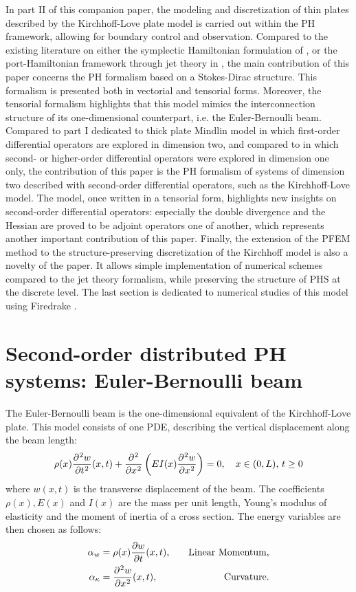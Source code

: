 \documentclass[preprint,12pt]{elsarticle}
\newcommand{\firstReviewer}[1]{\textcolor{red!80!black}{#1}}
\newcommand{\secondReviewer}[1]{\textcolor{blue!80!black}{#1}}
\begin{document}
In part II of this companion paper, the modeling and discretization of thin plates described by the Kirchhoff-Love plate model is carried out within the PH framework, allowing for boundary control and observation. Compared to the existing literature on either the symplectic Hamiltonian formulation of  \cite{LI2016984,LI2018310}, or the port-Hamiltonian framework through jet theory in \secondReviewer{\cite{jetMin,jetKirchh}}, the main contribution of this paper concerns the PH formalism based on a Stokes-Dirac structure. This formalism is presented both in vectorial and tensorial forms.  Moreover, the tensorial formalism \cite[Chapter~16]{Grinfield} highlights that this model mimics the interconnection structure of its one-dimensional counterpart, i.e. the Euler-Bernoulli beam. Compared to part I dedicated to thick plate Mindlin model in which first-order differential operators are explored in dimension two, and compared to \cite{LeGorrec2005} in which second-  or higher-order differential operators were explored in dimension one only, the contribution of this paper is the PH formalism of systems of dimension two described with second-order  differential operators, such as the Kirchhoff-Love  model. The model, once written in a tensorial form, highlights new insights on second-order differential operators: especially the double divergence and the Hessian are proved to be adjoint operators one of another, which represents another important contribution of this paper.
Finally, the extension of the PFEM method  to the structure-preserving discretization of the Kirchhoff model  is also a novelty of the paper. It allows simple implementation of numerical schemes compared to the jet theory formalism, while preserving the structure of PHS at the discrete level. \firstReviewer{The last section is dedicated to numerical studies of this model using Firedrake \cite{firedrake}.}

\section{Second-order distributed PH systems: Euler-Bernoulli beam}	
The Euler-Bernoulli beam is the one-dimensional equivalent of the Kirchhoff-Love plate.  This model consists of one PDE, describing the vertical displacement along the beam length:
\begin{equation}
\rho(x) \diffp[2]{w}{t}(x,t) + \displaystyle \diffp[2]{}{x} \left( EI(x) \diffp[2]{w}{x} \right) = 0, \quad x \in (0,L),\, t \ge 0 
\end{equation}
where ${w}(x,t)$ is the transverse displacement of the beam. The coefficients $\rho(x), E(x)$ and $I(x)$  are the mass per unit length, Young's modulus of elasticity and the moment of inertia of a cross section. The energy variables are then chosen as follows:
\begin{equation}
\begin{aligned}
\alpha_{w} &= \rho(x) \diffp{w}{t}(x,t),  &\quad \text{Linear Momentum},\\
\alpha_{\kappa} &= \diffp[2]{w}{x}(x,t), &\quad \text{Curvature}. \\
\end{aligned}
\end{equation}
\end{document}
